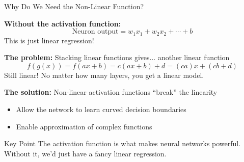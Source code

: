 \documentclass[10pt]{beamer}
\begin{document}
\begin{frame}{Why Do We Need the Non-Linear Function?}

  \textbf{Without the activation function:}
  \[
  \text{Neuron output} = w_1 x_1 + w_2 x_2 + \cdots + b
  \]
  This is just linear regression!

  \vspace{1em}
  \textbf{The problem:} Stacking linear functions gives... another linear function
  \[
  f(g(x)) = f(ax + b) = c(ax + b) + d = (ca)x + (cb + d)
  \]
  Still linear! No matter how many layers, you get a linear model.

  \vspace{1em}
  \textbf{The solution:} Non-linear activation functions ``break'' the linearity
  \begin{itemize}
    \item Allow the network to learn curved decision boundaries
    \item Enable approximation of complex functions
  \end{itemize}

  \vspace{0.5em}
  \begin{block}{Key Point}
    The activation function is what makes neural networks powerful. Without it, we'd just have a fancy linear regression.
  \end{block}
\end{frame}

\end{document}
